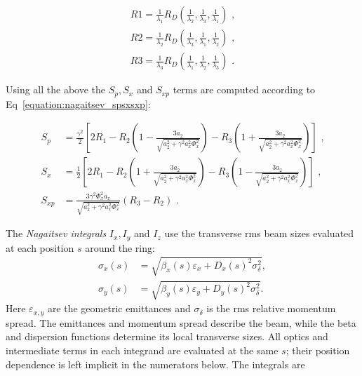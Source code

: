 \begin{equation}
    \begin{aligned}
        R1 = \frac{1}{\lambda_1} R_D(\frac{1}{\lambda_2}, \frac{1}{\lambda_3}, \frac{1}{\lambda_1}) \text{ ,} \\
        R2 = \frac{1}{\lambda_2} R_D(\frac{1}{\lambda_3}, \frac{1}{\lambda_1}, \frac{1}{\lambda_2}) \text{ ,} \\
        R3 = \frac{1}{\lambda_3} R_D(\frac{1}{\lambda_1}, \frac{1}{\lambda_2}, \frac{1}{\lambda_3}) \text{ .}
    \end{aligned}
    \label{equation:nagaitsev_r1r2r3}
\end{equation}

Using all the above the \(S_p, S_x\) and \(S_{xp}\) terms are computed according to Eq~\eqref{equation:nagaitsev_spsxsxp}:

\begin{equation}
    \begin{aligned}
        S_p &= \frac{\gamma^2}{2} \left[ 2 R_1 - R_2 \left(1 - \frac{3 a_2}{\sqrt{a_2^{2} + \gamma^2 a_x^{2} \Phi_x^2}}\right) - R_3 \left(1 + \frac{3 a_2}{\sqrt{a_2^{2} + \gamma^2 a_x^{2} \Phi_x^2}}\right) \right] \text{ ,} \\
        S_x &= \frac{1}{2} \left[ 2 R_1 - R_2 \left(1 + \frac{3 a_2}{\sqrt{a_2^{2} + \gamma^2 a_x^{2} \Phi_x^2}}\right) - R_3 \left(1 - \frac{3 a_2}{\sqrt{a_2^{2} + \gamma^2 a_x^{2} \Phi_x^2}}\right) \right] \text{ ,} \\
        S_{xp} &= \frac{3 \gamma^2 \Phi_x^2 a_x}{\sqrt{a_2^{2} + \gamma^2 a_x^{2} \Phi_x^2}} \left( R_3 - R_2 \right) \text{ .}
    \end{aligned}
    \label{equation:nagaitsev_spsxsxp}
\end{equation}

The \textit{Nagaitsev integrals} \(I_x, I_y\) and \(I_z\) use the transverse
rms beam sizes evaluated at each position \(s\) around the ring:
\begin{equation}
    \begin{aligned}
        \sigma_x(s) &= \sqrt{\beta_x(s)\varepsilon_x + D_x(s)^2\sigma_\delta^2}, \\
        \sigma_y(s) &= \sqrt{\beta_y(s)\varepsilon_y + D_y(s)^2\sigma_\delta^2}.
    \end{aligned}
    \label{equation:ibs_local_beam_sizes}
\end{equation}
Here \(\varepsilon_{x,y}\) are the geometric emittances and \(\sigma_\delta\)
is the rms relative momentum spread. The emittances and momentum spread
describe the beam, while the beta and dispersion functions determine its
local transverse sizes. All optics and intermediate terms in each integrand
are evaluated at the same \(s\); their position dependence is left implicit
in the numerators below. The integrals are

